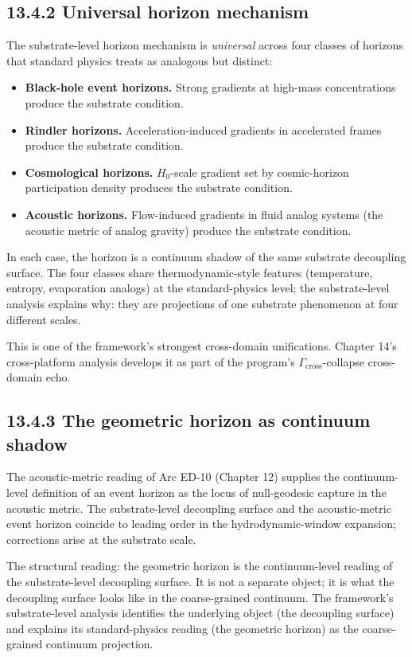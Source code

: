 \documentclass[11pt]{book}
\begin{document}
\subsection{13.4.2 Universal horizon mechanism}

The substrate-level horizon mechanism is \textit{universal} across four classes of horizons that standard physics treats as analogous but distinct:

\begin{itemize}
\item \textbf{Black-hole event horizons.} Strong gradients at high-mass concentrations produce the substrate condition.
\item \textbf{Rindler horizons.} Acceleration-induced gradients in accelerated frames produce the substrate condition.
\item \textbf{Cosmological horizons.} $H_0$-scale gradient set by cosmic-horizon participation density produces the substrate condition.
\item \textbf{Acoustic horizons.} Flow-induced gradients in fluid analog systems (the acoustic metric of analog gravity) produce the substrate condition.
\end{itemize}

In each case, the horizon is a continuum shadow of the same substrate decoupling surface. The four classes share thermodynamic-style features (temperature, entropy, evaporation analogs) at the standard-physics level; the substrate-level analysis explains why: they are projections of one substrate phenomenon at four different scales.

This is one of the framework's strongest cross-domain unifications. Chapter 14's cross-platform analysis develops it as part of the program's $\Gamma_\mathrm{cross}$-collapse cross-domain echo.

\subsection{13.4.3 The geometric horizon as continuum shadow}

The acoustic-metric reading of Arc ED-10 (Chapter 12) supplies the continuum-level definition of an event horizon as the locus of null-geodesic capture in the acoustic metric. The substrate-level decoupling surface and the acoustic-metric event horizon coincide to leading order in the hydrodynamic-window expansion; corrections arise at the substrate scale.

The structural reading: the geometric horizon is the continuum-level reading of the substrate-level decoupling surface. It is not a separate object; it is what the decoupling surface looks like in the coarse-grained continuum. The framework's substrate-level analysis identifies the underlying object (the decoupling surface) and explains its standard-physics reading (the geometric horizon) as the coarse-grained continuum projection.
\end{document}
